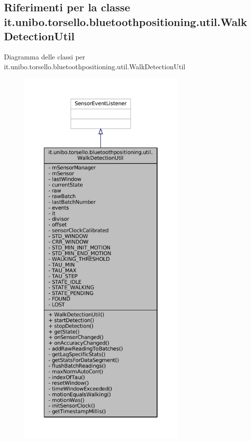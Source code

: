 \hypertarget{classit_1_1unibo_1_1torsello_1_1bluetoothpositioning_1_1util_1_1WalkDetectionUtil}{}\subsection{Riferimenti per la classe it.\+unibo.\+torsello.\+bluetoothpositioning.\+util.\+Walk\+Detection\+Util}
\label{classit_1_1unibo_1_1torsello_1_1bluetoothpositioning_1_1util_1_1WalkDetectionUtil}


Diagramma delle classi per it.\+unibo.\+torsello.\+bluetoothpositioning.\+util.\+Walk\+Detection\+Util
\nopagebreak
\begin{figure}[H]
\begin{center}
\leavevmode
\includegraphics[height=550pt]{classit_1_1unibo_1_1torsello_1_1bluetoothpositioning_1_1util_1_1WalkDetectionUtil__inherit__graph}
\end{center}
\end{figure}


